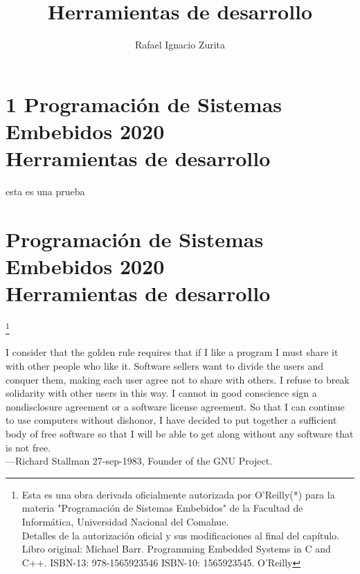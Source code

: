 \documentclass[output=paper, 
colorlinks,
citecolor=brown,
newtxmath
]{langscibook}
\author{Rafael Ignacio Zurita\affiliation{Universidad Nacional del Comahue}}
\title{Herramientas de desarrollo}
\begin{document}

\chapterfont{\Large\color{LightBlue}} 
\chapter*{1 Programación de Sistemas Embebidos 2020\\ Herramientas de desarrollo}
esta es una prueba
{\def\addcontentsline#1#2#3{}\maketitle}

\chapter*{Programación de Sistemas Embebidos 2020\\ Herramientas de desarrollo}

\begingroup
\let\clearpage\relax
\cleardoublepage
\hypersetup{linkcolor=blue}
\tableofcontents*
\endgroup


\footnote{\scriptsize\normalfont Esta es una obra derivada oficialmente autorizada por O'Reilly(*) para la materia "Programación de Sistemas Embebidos" de la Facultad de Informática, Universidad Nacional del Comahue. \\ Detalles de la autorización oficial y sus modificaciones al final del capítulo. \\ Libro original: Michael Barr. Programming Embedded Systems in C and C++. ISBN-13: 978-1565923546
ISBN-10: 1565923545. O'Reilly }

{\def\addcontentsline#1#2#3{}\maketitle}




\hfill\begin{minipage}{0.8\linewidth} \footnotesize
I consider that the golden rule requires that if I like a program I 
must share it with other people who like it. 
Software sellers want to divide the users and conquer them, making 
each user agree not to share with others. I refuse to break solidarity 
with other users in this way. I cannot in good conscience sign a
nondisclosure agreement or a software license agreement. 
So that I can continue to use computers
without dishonor, I have decided to put together a sufficient body of free software so that I will be able
to get along without any software that is not free.\\
—Richard Stallman 27-sep-1983, Founder of the GNU Project.
\end{minipage}
\end{document}
